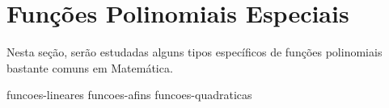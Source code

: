 \section{Funções Polinomiais Especiais}

Nesta seção, serão estudadas alguns tipos específicos de funções polinomiais bastante comuns em Matemática.

{funcoes-lineares}
{funcoes-afins}
{funcoes-quadraticas}